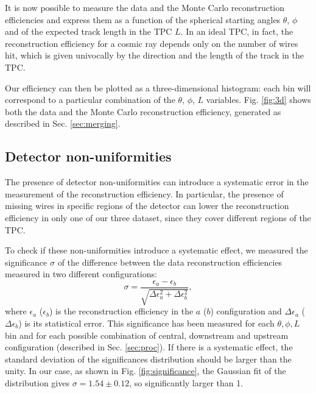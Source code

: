 \documentclass[a4paper]{scrartcl}
\begin{document}
It is now possible to measure the data and the Monte Carlo reconstruction efficiencies and express them as a function of the spherical starting angles $\theta$, $\phi$ and of the expected track length in the TPC $L$. In an ideal TPC, in fact, the reconstruction efficiency for a cosmic ray depends only on the number of wires hit, which is given univocally by the direction and the length of the track in the TPC.

Our efficiency can then be plotted as a three-dimensional histogram: each bin will correspond to a particular combination of the $\theta$, $\phi$, $L$ variables. Fig. \ref{fig:3d} shows both the data and the Monte Carlo reconstruction efficiency, generated as described in Sec. \ref{sec:merging}.



\subsection{Detector non-uniformities}\label{sec:wires}
The presence of detector non-uniformities can introduce a systematic error in the measurement of the reconstruction efficiency. In particular, the presence of missing wires in specific regions of the detector can lower the reconstruction efficiency in only one of our three dataset, since they cover different regions of the TPC.

To check if these non-uniformities introduce a systematic effect, we measured the significance $\sigma$ of the difference between the data reconstruction efficiencies measured in two different configurations:
\begin{equation}
\sigma = \frac{\epsilon_a-\epsilon_b}{\sqrt{\Delta \epsilon_{a}^2 + \Delta \epsilon_b^2}},
\end{equation}
where $\epsilon_{a}$ ($\epsilon_{b}$) is the reconstruction efficiency in the $a$ ($b$) configuration and $\Delta \epsilon_{a}$ ($\Delta \epsilon_{b}$) is its statistical error. This significance has been measured for each $\theta,\phi,L$ bin and for each possible combination of central, downstream and upstream configuration (described in Sec. \ref{sec:proc}). If there is a systematic effect, the standard deviation of the significances distribution should be larger than the unity. In our case, as shown in Fig. \ref{fig:significance}, the Gaussian fit of the distribution gives $\sigma = 1.54\pm0.12$, so significantly larger than 1.
\end{document}
